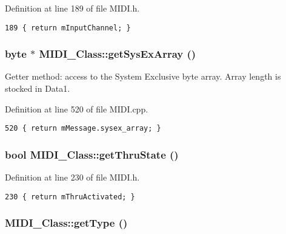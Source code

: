 Definition at line 189 of file MIDI.h.

\begin{Code}\begin{verbatim}189 { return mInputChannel; }
\end{verbatim}
\end{Code}


\hypertarget{class_m_i_d_i___class_4540dd7720884677b50cff2f23d1982a}{
\subsubsection[{getSysExArray}]{\setlength{\rightskip}{0pt plus 5cm}byte $\ast$ MIDI\_\-Class::getSysExArray ()}}
\label{class_m_i_d_i___class_4540dd7720884677b50cff2f23d1982a}


Getter method: access to the System Exclusive byte array. Array length is stocked in Data1. 

Definition at line 520 of file MIDI.cpp.

\begin{Code}\begin{verbatim}520 { return mMessage.sysex_array; }
\end{verbatim}
\end{Code}


\hypertarget{class_m_i_d_i___class_76c71d380b9221207062aa669a9c0005}{
\subsubsection[{getThruState}]{\setlength{\rightskip}{0pt plus 5cm}bool MIDI\_\-Class::getThruState ()}}
\label{class_m_i_d_i___class_76c71d380b9221207062aa669a9c0005}




Definition at line 230 of file MIDI.h.

\begin{Code}\begin{verbatim}230 { return mThruActivated; }
\end{verbatim}
\end{Code}


\hypertarget{class_m_i_d_i___class_b43d8c2b277cf2408865b4f63111080b}{
\subsubsection[{getType}]{ MIDI\_\-Class::getType ()}}
\label{class_m_i_d_i___class_b43d8c2b277cf2408865b4f63111080b}



